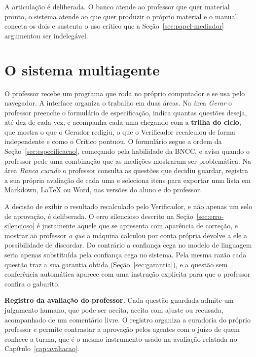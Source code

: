A articulação é deliberada. O banco atende ao professor que quer material pronto, o sistema atende
ao que quer produzir o próprio material e o manual conecta os dois e sustenta o uso crítico que a
Seção~\ref{sec:papel-mediador} argumentou ser indelegável.

\section{O sistema multiagente}
\label{sec:produto-sistema}

O professor recebe um programa que roda no próprio computador e se usa pelo navegador. A interface
organiza o trabalho em duas áreas. Na área \emph{Gerar} o professor preenche o formulário de
especificação, indica quantas questões deseja, até dez de cada vez, e acompanha cada uma chegando
com a \textbf{trilha do ciclo}, que mostra o que o Gerador redigiu, o que o Verificador recalculou
de forma independente e como o Crítico pontuou. O formulário segue a ordem da
Seção~\ref{sec:especificacao}, começando pela habilidade da BNCC, e avisa quando o professor pede
uma combinação que as medições mostraram ser problemática. Na área \emph{Banco curado} o professor
consulta as questões que decidiu guardar, registra a sua própria avaliação de cada uma e seleciona
itens para exportar uma lista em Markdown, \LaTeX{} ou Word, nas versões do aluno e do professor.

A decisão de exibir o resultado recalculado pelo Verificador, e não apenas um selo de aprovação, é
deliberada. O erro silencioso descrito na Seção~\ref{sec:erro-silencioso} é justamente aquele que
se apresenta com aparência de correção, e mostrar ao professor \emph{o que} a máquina calculou por
conta própria devolve a ele a possibilidade de discordar. Do contrário a confiança cega no modelo de
linguagem seria apenas substituída pela confiança cega no sistema. Pela mesma razão cada questão
traz a sua garantia obtida (Seção~\ref{sec:garantia}), e a questão sem conferência automática
aparece com uma instrução explícita para que o professor confira o gabarito.

\textbf{Registro da avaliação do professor.} Cada questão guardada admite um julgamento humano,
que pode ser aceita, aceita com ajuste ou recusada, acompanhado de um comentário livre. O registro
organiza a curadoria do próprio professor e permite contrastar a aprovação pelos agentes com o juízo
de quem conhece a turma, que é o mesmo instrumento usado na avaliação relatada no
Capítulo~\ref{cap:avaliacao}.

